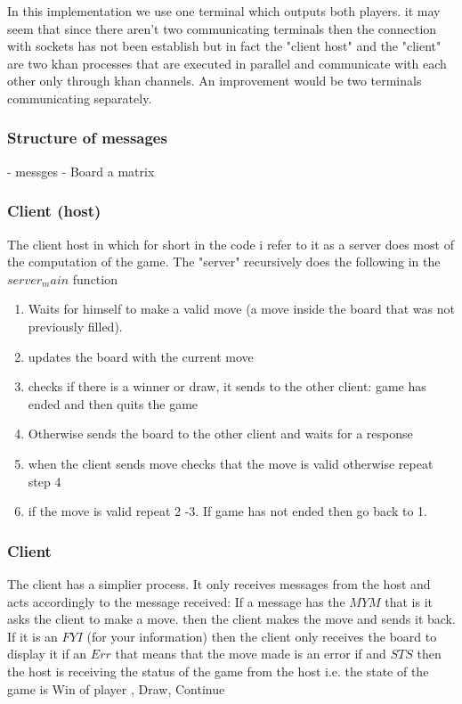 \documentclass{article}
\begin{document}

In this implementation we use one terminal which outputs both players. it may seem that since there aren't two communicating terminals then the connection with sockets has not been establish but in fact the "client host" and the "client" are two khan processes that are executed in parallel and communicate with each other only through khan channels. An improvement would be two terminals communicating separately.


\subsubsection*{Structure of messages}
- messges 
- Board a matrix

\subsubsection*{Client (host)}
The client host in which for short in the code i refer to it as a server does most of the computation of the game.  The "server" recursively does the following in the $server_main$ function
\begin{enumerate}
\item Waits for himself to make a valid move (a move inside the board that was not previously filled).
\item updates the board with the current move
\item checks if there is a winner or draw, it sends to the other client: game has ended and then quits the game
\item Otherwise sends the board to the other client and waits for a response
\item when the client sends move checks that the move is valid otherwise repeat step 4 
\item if the move is valid repeat 2 -3. If game has not ended then go back to 1.
\end{enumerate}
\subsubsection*{Client }
The client has a simplier process. It only receives messages from the host and acts accordingly to the message received:
If a message has the $MYM$ that is it asks the client to make a move. then the client makes the move and sends it back.
If it is an $FYI$ (for your information) then the client only receives the board to display it
if an $Err$ that means that the move made is an error
if and $STS$ then the host is receiving the status of the game from the host i.e. the state of the game is Win of player , Draw, Continue
\end{document}
